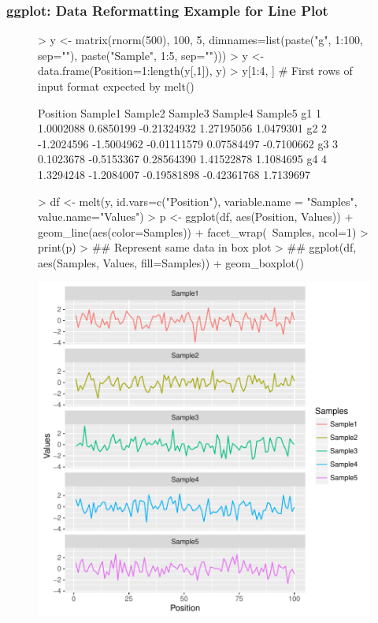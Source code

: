 \documentclass{beamer}
\begin{document}
\begin{frame}[containsverbatim]  
	\frametitle{ggplot: Data Reformatting Example for Line Plot}
\tiny
\begin{figure}
  \centering
\begin{Schunk}
\begin{Sinput}
> y <- matrix(rnorm(500), 100, 5, dimnames=list(paste("g", 1:100, sep=""), paste("Sample", 1:5, sep="")))
> y <- data.frame(Position=1:length(y[,1]), y)
> y[1:4, ] # First rows of input format expected by melt()
\end{Sinput}
\begin{Soutput}
   Position    Sample1    Sample2     Sample3     Sample4    Sample5
g1        1  1.0002088  0.6850199 -0.21324932  1.27195056  1.0479301
g2        2 -1.2024596 -1.5004962 -0.01111579  0.07584497 -0.7100662
g3        3  0.1023678 -0.5153367  0.28564390  1.41522878  1.1084695
g4        4  1.3294248 -1.2084007 -0.19581898 -0.42361768  1.7139697
\end{Soutput}
\begin{Sinput}
> df <- melt(y, id.vars=c("Position"), variable.name = "Samples", value.name="Values")
> p <- ggplot(df, aes(Position, Values)) + geom_line(aes(color=Samples)) + facet_wrap(~Samples, ncol=1)
> print(p)
> ## Represent same data in box plot
> ## ggplot(df, aes(Samples, Values, fill=Samples)) + geom_boxplot()
\end{Sinput}
\end{Schunk}
\includegraphics{fig--066}
\label{fig:lineplot_split}
\end{figure}
\end{frame}
\end{document}
